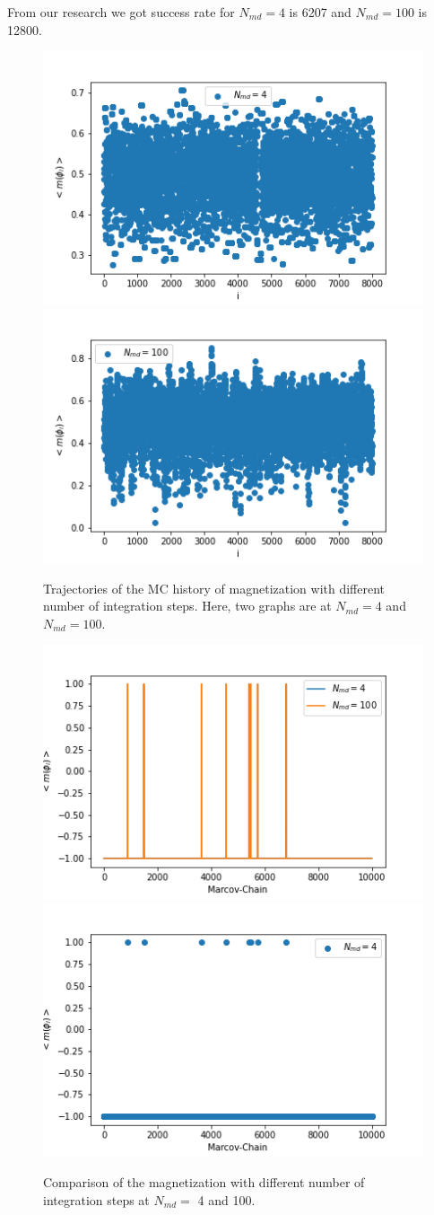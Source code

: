 \documentclass[11pt, a4paper, DIV=12]{scrartcl}
\begin{document}
 From our research we got success rate for $ N_{md}=4$ is 6207 and $ N_{md}=100 $ is 12800.
	
\begin{figure}[H]
		\centering
\includegraphics[width=0.6\linewidth]{comparison_magnitization_4.png}\includegraphics[width=0.6\linewidth]{comparison_magnitization_100.png}
\caption{Trajectories of the MC history of magnetization with different number of integration steps. Here, two graphs are at $ N_{md}=4$ and $ N_{md}=100$.}
	\label{fig:comperision_4_100}
\end{figure}


\begin{figure}[H]
		\centering
	\includegraphics[width=0.6\linewidth]{comparison.png}\includegraphics[width=0.6\linewidth]{comparison_magnitization.png}
		\caption{Comparison of the magnetization with different number of integration steps at $ N_{md}=$ 4 and 100.}
		\label{fig:comperison}
\end{figure}	
	
\end{document}
